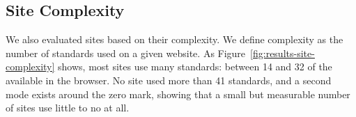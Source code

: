 \subsection{Site Complexity} \label{sec:results-site-complexity}



We also evaluated sites based on their complexity. We define complexity as the
number of standards used on a given website.  As
Figure~\ref{fig:results-site-complexity} shows, most sites use many standards:
between 14 and 32 of the \numstandards available in the browser. No site used
more than 41 standards, and a second mode exists around the zero mark, showing
that a small but measurable number of sites use little to no \JS at all.
